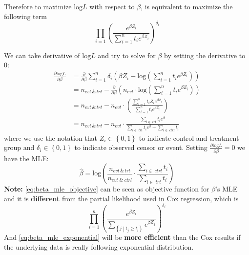 \documentclass[a4paper,12pt]{article}
\begin{document}
Therefore to maximize $\mathrm{log}L$ with respect to $\beta$, is equivalent to maximize the following term
\begin{equation}
  \label{eq:beta_mle_objective}
  \prod\limits_{i = 1}\left(
    \frac{e^{\beta Z_i}}{\sum\limits_{i = 1}^nt_ie^{\beta Z_i}}
  \right)^{\delta_i}
\end{equation}

We can take derivative of $\mathrm{log}L$ and try to solve for $\beta$ by setting the derivative to 0:
\[
  \begin{aligned}
    \frac{\partial \mathrm{log}L}{\partial \beta}
    &= \frac{\partial}{\partial\beta}
      \sum\limits_{i = 1}^n\delta_i\left(
      \beta Z_i - \mathrm{log}\left(\sum\limits_{i = 1}^nt_ie^{\beta Z_i}\right)
      \right)    \\
    &= n_{evt \,\&\, trt}
      - \frac{\partial}{\partial\beta}
      \left(n_{evt} \cdot
      \mathrm{log}\left(\sum\limits_{i = 1}^nt_ie^{\beta Z_i}\right)
      \right)    \\
    &= n_{evt\,\&\,trt}
      - n_{evt}\cdot \left(
      \frac{\sum\limits_{i = 1}^nt_iZ_ie^{\beta Z_i}}{\sum\limits_{i = 1}^nt_ie^{\beta Z_i}}
      \right)    \\
    &= n_{evt\,\&\,trt}
      - n_{evt} \cdot
      \frac{\sum\limits_{i\in\;trt}t_ie^{\beta}}{
      \sum\limits_{i\in\;trt}t_ie^{\beta} + \sum\limits_{i\in\;ctrl}t_i}
  \end{aligned}
\]
where we use the notation that $Z_i\in\left\{0, 1\right\}$ to indicate control and treatment group and $\delta_i\in\left\{0, 1\right\}$ to indicate observed censor or event. Setting $\frac{\partial\mathrm{log}L}{\partial \beta} = 0$ we have the MLE:
\begin{equation}
  \label{eq:beta_mle_exponential}
  \hat{\beta} = \mathrm{log}\left(
    \frac{n_{evt\,\&\,trt}}{n_{evt\;\&\;ctrl}}
    \cdot
    \frac{\sum\limits_{i\in\;ctrl}t_i}{\sum\limits_{i\in\;trt}t_i}
  \right)
\end{equation}
\textbf{Note:} \eqref{eq:beta_mle_objective} can be seen as objective function for $\beta$'s MLE and it is \textbf{different} from the partial likelihood used in Cox regression, which is
\[
  \prod\limits_{i = 1}^n\left(
    \frac{e^{\beta Z_i}}{\sum\limits_{\left\{j\middle|t_j\geq t_i\right\}}e^{\beta Z_j}}
  \right)^{\delta_i}
\]
And \eqref{eq:beta_mle_exponential} will be \textbf{more efficient} than the Cox results if the underlying data is really following exponential distribution. 
\end{document}
